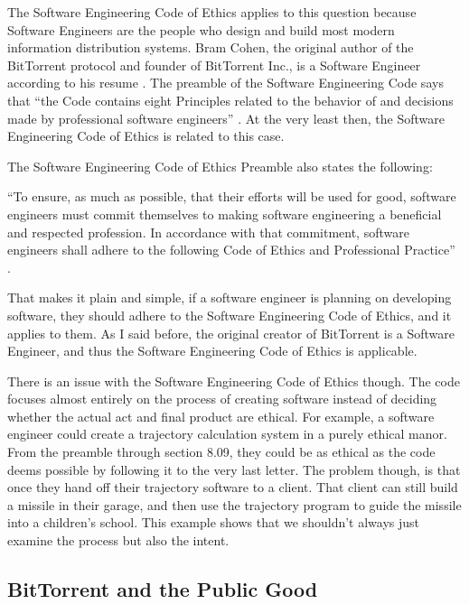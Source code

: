 \documentclass[11pt]{article}
\begin{document}
\begin{multicols}{2}
The Software Engineering Code of Ethics applies to this question because Software Engineers are the people who design and build most modern information distribution systems. Bram Cohen, the original author of the BitTorrent protocol and founder of BitTorrent Inc., is a Software Engineer according to his resume \cite{cohen}. The preamble of the Software Engineering Code says that ``the Code contains eight Principles related to the behavior of and decisions made by professional software engineers'' \cite{secode}. At the very least then, the Software Engineering Code of Ethics is related to this case.

The Software Engineering Code of Ethics Preamble also states the following:

{\addtolength{\leftskip}{6mm}

\noindent ``To ensure, as much as possible, that their efforts will be used for good, software engineers must commit themselves to making software engineering a beneficial and respected profession. In accordance with that commitment, software engineers shall adhere to the following Code of Ethics and Professional Practice'' \cite{secode}.

}

That makes it plain and simple, if a software engineer is planning on developing software, they should adhere to the Software Engineering Code of Ethics, and it applies to them. As I said before, the original creator of BitTorrent is a Software Engineer, and thus the Software Engineering Code of Ethics is applicable.

There is an issue with the Software Engineering Code of Ethics though. The code focuses almost entirely on the process of creating software instead of deciding whether the actual act and final product are ethical. For example, a software engineer could create a trajectory calculation system in a purely ethical manor. From the preamble through section 8.09, they could be as ethical as the code deems possible by following it to the very last letter. The problem though, is that once they hand off their trajectory software to a client. That client can still build a missile in their garage, and then use the trajectory program to guide the missile into a children's school. This example shows that we shouldn't always just examine the process but also the intent.

\subsection{BitTorrent and the Public Good}


\end{multicols}
\end{document}
